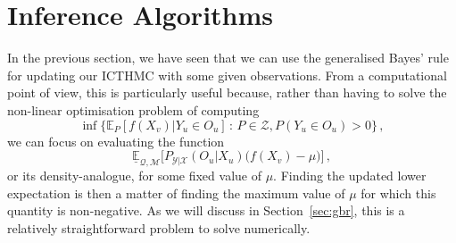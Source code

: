\documentclass[twoside,11pt]{article}
\newcommand{\reals}{\mathbb{R}}
\newcommand{\states}{\mathcal{X}}
\newcommand{\observs}{\mathcal{Y}}
\newcommand{\lexp}{\underline{\mathbb{E}}_{\rateset,\mathcal{M}}}
\newcommand{\gambles}{\mathcal{L}}
\newcommand{\rateset}{\mathcal{Q}}
\begin{document}
%

\section{Inference Algorithms}\label{sec:inference_algos}

In the previous section, we have seen that we can use the generalised Bayes' rule for updating our ICTHMC with some given observations. From a computational point of view, this is particularly useful because, rather than having to solve the non-linear optimisation problem of computing
\begin{equation*}
\inf\bigl\{\mathbb{E}_P[f(X_v)\vert Y_u\in O_u]\,:\, P\in\mathcal{Z},P(Y_u\in O_u)>0\bigr\}\,,
\end{equation*}
we can focus on evaluating the function
\begin{equation*}
\lexp\bigl[P_{\observs\vert\states}(O_u\vert X_u)\bigl(f(X_v) - \mu\bigr)\bigr]\,,
\end{equation*}
or its density-analogue, for some fixed value of $\mu$. Finding the updated lower expectation is then a matter of finding the maximum value of $\mu$ for which this quantity is non-negative. As we will discuss in Section~\ref{sec:gbr}, this is a relatively straightforward problem to solve numerically.
\end{document}
